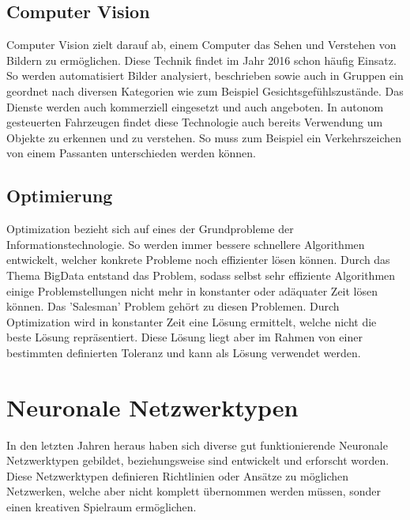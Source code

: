\subsection{Computer Vision}
\label{subsec:Cumputer Vision}

Computer Vision zielt darauf ab, einem Computer das Sehen und Verstehen von Bildern zu ermöglichen. 
Diese Technik findet im Jahr 2016 schon häufig Einsatz. 
So werden automatisiert Bilder analysiert, beschrieben sowie auch in Gruppen ein geordnet nach diversen Kategorien wie zum Beispiel Gesichtsgefühlszustände.
Das Dienste werden auch kommerziell eingesetzt und auch angeboten. 
In autonom gesteuerten Fahrzeugen findet diese Technologie auch bereits Verwendung um Objekte zu erkennen und zu verstehen. 
So muss zum Beispiel ein Verkehrszeichen von einem Passanten unterschieden werden können.

\subsection{Optimierung}
\label{subsec:Optimization}

Optimization bezieht sich auf eines der Grundprobleme der Informationstechnologie. 
So werden immer bessere schnellere Algorithmen entwickelt, welcher konkrete Probleme noch effizienter lösen können. 
Durch das Thema BigData entstand das Problem, sodass selbst sehr effiziente Algorithmen einige Problemstellungen nicht mehr in konstanter oder adäquater Zeit lösen können. 
Das 'Salesman' Problem gehört zu diesen Problemen. 
Durch Optimization wird in konstanter Zeit eine Lösung ermittelt, welche nicht die beste Lösung repräsentiert. 
Diese Lösung liegt aber im Rahmen von einer bestimmten definierten Toleranz und kann als Lösung verwendet werden. \cite{AI3}

\section{Neuronale Netzwerktypen}

In den letzten Jahren heraus haben sich diverse gut funktionierende Neuronale Netzwerktypen gebildet,  beziehungsweise sind entwickelt und erforscht worden. 
Diese Netzwerktypen definieren Richtlinien oder Ansätze zu möglichen Netzwerken, welche aber nicht komplett übernommen werden müssen, sonder einen kreativen Spielraum ermöglichen. \\


